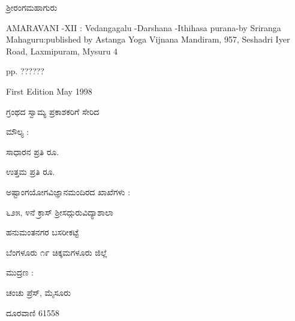\vskip 5cm

\begin{center}
{\large ಶ್ರೀರಂಗಮಹಾಗುರು}
\end{center}

\newpage

{\eng AMARAVANI -XII : Vedangagalu -Darshana -Ithihasa purana-by Sriranga Mahaguru:published by Astanga Yoga Vijnana Mandiram, 957, Seshadri Iyer Road, Laxmipuram, Mysuru 4}

\medskip
{\eng pp. ??????}%

\medskip
{\eng First Edition May 1998}

\medskip

ಗ್ರಂಥದ ಸ್ವಾಮ್ಯ ಪ್ರಕಾಶಕರಿಗೆ ಸೇರಿದ

\vskip 3cm
\begin{center}
ಮೌಲ್ಯ :

ಸಾಧಾರನ ಪ್ರತಿ ರೂ.

ಉತ್ತಮ ಪ್ರತಿ ರೂ.
\end{center}

\vskip 2cm

\begin{center}
ಅಷ್ಟಾಂಗಯೋಗವಿಜ್ಞಾನಮಂದಿರದ ಖಾಖೆಗಳು :

\medskip
೬೨೫, ೪ನೆ ಕ್ರಾಸ್ \hspace{1cm}  ಶ್ರೀಸದ್ಗುರುವಿದ್ಯಾಶಾಲಾ

\medskip
ಹನುಮಂತನಗರ \hspace{2.5cm} ಬಸರೀಕಟ್ಟೆ

\medskip
ಬೆಂಗಳೂರು ೧೯ \hspace{1.3cm} ಚಿಕ್ಕಮಗಳೂರು ಜಿಲ್ಲೆ
\end{center}

\vskip 2cm

\begin{center}
ಮುದ್ರಣ :

ಚಂಚು ಪ್ರೆಸ್, ಮೈಸೂರು

ದೂರವಾಣಿ {\rm 61558}
\end{center}
